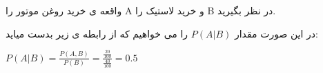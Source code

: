 واقعه ی خرید روغن موتور را A 
و خرید لاستیک را B 
در نظر بگیرید.

در این صورت مقدار 
$P(A|B)$
را می خواهیم که از رابطه ی زیر بدست میاید:

$P(A|B) = \frac{P(A,B)}{P(B)} = \frac{\frac{20}{100}}{\frac{40}{100}} = 0.5$